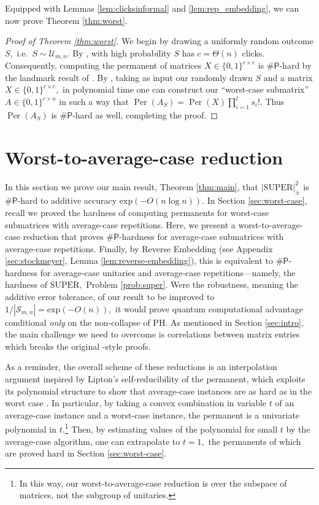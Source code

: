 \documentclass[11pt]{article}
\theoremstyle{plain}
\theoremstyle{plain}
\theoremstyle{plain}
\theoremstyle{plain}
\theoremstyle{plain}
\theoremstyle{plain}
\theoremstyle{plain}
\theoremstyle{remark}
\theoremstyle{remark}
\theoremstyle{plain}
\theoremstyle{plain}
\theoremstyle{plain}
\theoremstyle{plain}
\newcommand{\Per}{\operatorname{Per}}
\newcommand{\superap}{\lvert \mathrm{SUPER}\rvert^2_\pm}
\newcommand{\Smn}{\mathcal{S}_{m,n}}
\renewcommand{\exp}{\mathrm{exp}}
\newcommand{\sharP}{\#\mathsf{P}}
\begin{document}
Equipped with Lemmas \ref{lem:clicksinformal} and \ref{lem:rep_embedding}, we can now prove Theorem \ref{thm:worst}.
\begin{proof}[Proof of Theorem \ref{thm:worst}]
    We begin by drawing a uniformly random outcome $S,$ i.e.\ $S\sim\mathcal U_{m,n}.$ By , with high probability $S$ has $c=\Theta(n)$ clicks. Consequently, computing the permanent of matrices $X\in\{0,1\}^{c\times c}$ is $\sharP$-hard by the landmark result of \cite{valiant1979}. By , taking as input our randomly drawn $S$ and a matrix $X\in\{0,1\}^{c\times c},$ in polynomial time one can construct our ``worst-case submatrix'' $A \in \{0, 1\}^{c \times n}$ in such a way that $\Per(A_S) = \Per(X) \prod_{i=1}^l s_i!.$ Thus $\Per(A_S)$ is $\sharP$-hard as well, completing the proof.  
\end{proof}

\section{Worst-to-average-case reduction}\label{sec:avgcase}

In this section we prove our main result, Theorem \ref{thm:main}, that $\superap$ is $\sharP$-hard to additive accuracy $\exp(-O(n \log n))$. In Section \ref{sec:worst-case}, recall we proved the hardness of computing permanents for worst-case submatrices with average-case repetitions. Here, we present a worst-to-average-case reduction that proves $\sharP$-hardness for average-case submatrices with average-case repetitions. Finally, by Reverse Embedding (see Appendix \ref{sec:stockmeyer}, Lemma \ref{lem:reverse-embedding}), this is equivalent to $\sharP$-hardness for average-case unitaries and average-case repetitions---namely, the hardness of $\mathrm{SUPER},$ Problem \ref{prob:super}.
Were the robustness, meaning the additive error tolerance, of our result to be improved to $1/|\Smn| = \exp(-O(n)),$ it would prove quantum computational advantage conditional \emph{only} on the non-collapse of \textsf{PH}.
As mentioned in Section \ref{sec:intro}, the main challenge we need to overcome is correlations between matrix entries which breaks the original \cite{Aaronson2013,Bouland2021}-style proofs.



As a reminder, the overall scheme of these reductions is an interpolation argument inspired by Lipton's self-reducibility of the permanent, which exploits its polynomial structure to show that average-case instances are as hard as in the worst case \cite{lipton1991}. In particular, by taking a convex combination in variable $t$ of an average-case instance and a worst-case instance, the permanent is a univariate polynomial in $t.$\footnote{In this way, our worst-to-average-case reduction is over the subspace of matrices, not the subgroup of unitaries.} Then, by estimating values of the polynomial for small $t$ by the average-case algorithm, one can extrapolate to $t=1,$ the permanents of which are proved hard in Section \ref{sec:worst-case}.
\end{document}

